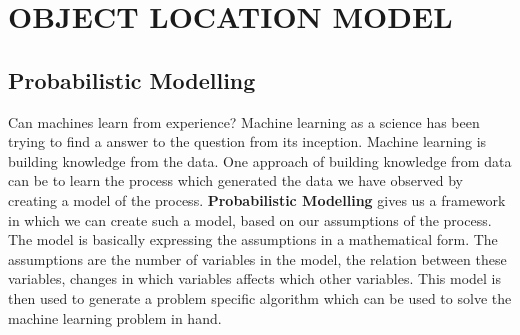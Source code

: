 \chapter{OBJECT LOCATION MODEL} 

\section{Probabilistic Modelling}
\label{sec:probability modelling}

Can machines learn from experience? Machine learning as a science has been trying to find a answer to the question from its inception. Machine learning is building knowledge from the data. One approach of building knowledge from data can be to learn the process which generated the data we have observed by creating a model of the process.
\textbf{Probabilistic Modelling} gives us a framework in which we can create such a model, based on our assumptions of the process. The model is basically expressing the assumptions in a mathematical form. The assumptions are the number of variables in the model, the relation between these variables, changes in which variables affects which other variables. This model is then used to generate a problem specific algorithm which can be used to solve the machine learning problem in hand. 

